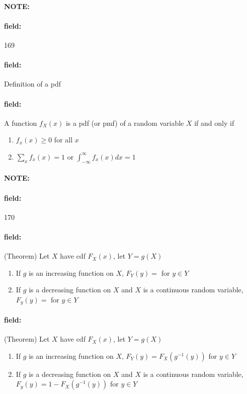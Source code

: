\documentclass[12pt]{article}
\newenvironment{note}{\paragraph{NOTE:}}{}
\newenvironment{field}{\paragraph{field:}}{}
\begin{document}
\begin{note} \begin{field} \tiny 169 \end{field}
  \begin{field}
    Definition of a pdf
  \end{field}
  \begin{field}
    A function $f_X(x)$ is a pdf (or pmf) of a random variable $X$ if and only if
    \begin{enumerate}
      \item $f_x(x) \geq 0$ for all $x$
      \item $\sum_x f_x(x) = 1$ or $\int_{-\infty}^\infty f_x(x) dx = 1$
    \end{enumerate}
  \end{field}
\end{note}


\begin{note} \begin{field} \tiny 170 \end{field}
  \begin{field}
    (Theorem) Let $X$ have cdf $F_X(x)$, let $Y = g(X)$
    \begin{enumerate}
      \item If $g$ is an increasing function on $X$, $F_Y(y) = $ for $y \in Y$
      \item If $g$ is a decreasing function on $X$ and $X$ is a continuous random variable, $F_y(y) = $ for $y \in Y$
    \end{enumerate}
  \end{field}
  \begin{field}
    (Theorem) Let $X$ have cdf $F_X(x)$, let $Y = g(X)$
    \begin{enumerate}
      \item If $g$ is an increasing function on $X$, $F_Y(y) = F_X(g^{-1}(y))$ for $y \in Y$
      \item If $g$ is a decreasing function on $X$ and $X$ is a continuous random variable, $F_y(y) = 1 - F_X(g^{-1}(y))$ for $y \in Y$
    \end{enumerate}
  \end{field}
\end{note}
\end{document}
